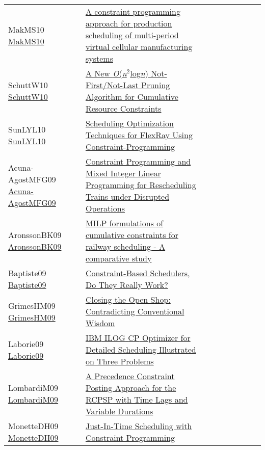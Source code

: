 {\begin{longtable}{p{3cm}p{7cm}lllllll}
MakMS10 \href{https://doi.org/10.1109/ICNC.2010.5583494}{MakMS10} &  \href{papers/MakMS10.pdf}{A constraint programming approach for production scheduling of multi-period virtual cellular manufacturing systems} &  &  &  &  &  &  & \\
SchuttW10 \href{https://doi.org/10.1007/978-3-642-15396-9\_36}{SchuttW10} &  \href{papers/SchuttW10.pdf}{A New \emph{O}(\emph{n}\({}^{\mbox{2}}\)log\emph{n}) Not-First/Not-Last Pruning Algorithm for Cumulative Resource Constraints} &  &  &  &  &  &  & \\
SunLYL10 \href{https://doi.org/10.1109/GreenCom-CPSCom.2010.111}{SunLYL10} &  \href{papers/SunLYL10.pdf}{Scheduling Optimization Techniques for FlexRay Using Constraint-Programming} &  &  &  &  &  &  & \\
Acuna-AgostMFG09 \href{https://doi.org/10.1007/978-3-642-01929-6\_24}{Acuna-AgostMFG09} &  \href{papers/Acuna-AgostMFG09.pdf}{Constraint Programming and Mixed Integer Linear Programming for Rescheduling Trains under Disrupted Operations} &  &  &  &  &  &  & \\
AronssonBK09 \href{http://drops.dagstuhl.de/opus/volltexte/2009/2141}{AronssonBK09} &  \href{papers/AronssonBK09.pdf}{{MILP} formulations of cumulative constraints for railway scheduling - {A} comparative study} &  &  &  &  &  &  & \\
Baptiste09 \href{https://doi.org/10.1007/978-3-642-04244-7\_1}{Baptiste09} &  \href{papers/Baptiste09.pdf}{Constraint-Based Schedulers, Do They Really Work?} &  &  &  &  &  &  & \\
GrimesHM09 \href{https://doi.org/10.1007/978-3-642-04244-7\_33}{GrimesHM09} &  \href{papers/GrimesHM09.pdf}{Closing the Open Shop: Contradicting Conventional Wisdom} &  &  &  &  &  &  & \\
Laborie09 \href{https://doi.org/10.1007/978-3-642-01929-6\_12}{Laborie09} &  \href{papers/Laborie09.pdf}{{IBM} {ILOG} {CP} Optimizer for Detailed Scheduling Illustrated on Three Problems} &  &  &  &  &  &  & \\
LombardiM09 \href{https://doi.org/10.1007/978-3-642-04244-7\_45}{LombardiM09} &  \href{papers/LombardiM09.pdf}{A Precedence Constraint Posting Approach for the {RCPSP} with Time Lags and Variable Durations} &  &  &  &  &  &  & \\
MonetteDH09 \href{http://aaai.org/ocs/index.php/ICAPS/ICAPS09/paper/view/712}{MonetteDH09} &  \href{papers/MonetteDH09.pdf}{Just-In-Time Scheduling with Constraint Programming} &  &  &  &  &  &  & \\

\end{longtable}}
